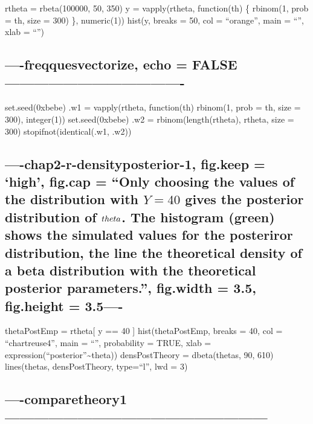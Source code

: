 \documentclass[]{article}
\begin{document}
rtheta = rbeta(100000, 50, 350) y = vapply(rtheta, function(th) \{
rbinom(1, prob = th, size = 300) \}, numeric(1)) hist(y, breaks = 50,
col = ``orange'', main = ``'', xlab = ``'')

\subsection{----freqquesvectorize, echo =
FALSE-------------------------------------}\label{freqquesvectorize-echo-false-}

set.seed(0xbebe) .w1 = vapply(rtheta, function(th) rbinom(1, prob = th,
size = 300), integer(1)) set.seed(0xbebe) .w2 = rbinom(length(rtheta),
rtheta, size = 300) stopifnot(identical(.w1, .w2))

\subsection{\texorpdfstring{----chap2-r-densityposterior-1, fig.keep =
`high', fig.cap = ``Only choosing the values of the distribution with
\(Y=40\) gives the posterior distribution of \(\\theta\). The histogram
(green) shows the simulated values for the posteriror distribution, the
line the theoretical density of a beta distribution with the theoretical
posterior parameters.'', fig.width = 3.5, fig.height =
3.5----}{----chap2-r-densityposterior-1, fig.keep = high, fig.cap = Only choosing the values of the distribution with Y=40 gives the posterior distribution of \textbackslash{}\textbackslash{}theta. The histogram (green) shows the simulated values for the posteriror distribution, the line the theoretical density of a beta distribution with the theoretical posterior parameters., fig.width = 3.5, fig.height = 3.5----}}\label{chap2-r-densityposterior-1-fig.keep-high-fig.cap-only-choosing-the-values-of-the-distribution-with-y40-gives-the-posterior-distribution-of-theta.-the-histogram-green-shows-the-simulated-values-for-the-posteriror-distribution-the-line-the-theoretical-density-of-a-beta-distribution-with-the-theoretical-posterior-parameters.-fig.width-3.5-fig.height-3.5-}

thetaPostEmp = rtheta{[} y == 40 {]} hist(thetaPostEmp, breaks = 40, col
= ``chartreuse4'', main = ``'', probability = TRUE, xlab =
expression(``posterior''\textasciitilde{}theta)) densPostTheory =
dbeta(thetas, 90, 610) lines(thetas, densPostTheory, type=``l'', lwd =
3)

\subsection{----comparetheory1------------------------------------------------------}\label{comparetheory1}
\end{document}
